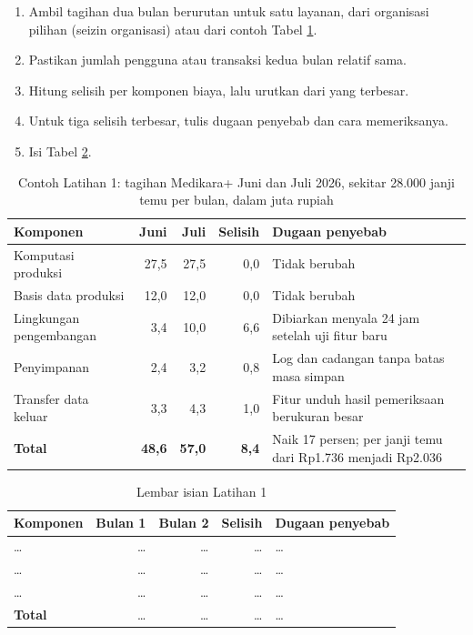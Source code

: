 \begin{enumerate}
  \item Ambil tagihan dua bulan berurutan untuk satu layanan, dari organisasi pilihan (seizin
        organisasi) atau dari contoh Tabel \ref{tab:ch03-lat1-contoh}.
  \item Pastikan jumlah pengguna atau transaksi kedua bulan relatif sama.
  \item Hitung selisih per komponen biaya, lalu urutkan dari yang terbesar.
  \item Untuk tiga selisih terbesar, tulis dugaan penyebab dan cara memeriksanya.
  \item Isi Tabel \ref{tab:ch03-lat1-hasil}.
\end{enumerate}

\begin{table}[!htb]
  \centering
  \caption{Contoh Latihan 1: tagihan Medikara+ Juni dan Juli 2026, sekitar
           28.000 janji temu per bulan, dalam juta rupiah}
  \label{tab:ch03-lat1-contoh}
  \footnotesize
  \begin{tabularx}{\textwidth}{>{\raggedright\arraybackslash}p{2.8cm} r r r >{\raggedright\arraybackslash}X}
    \hline
    \textbf{Komponen} & \textbf{Juni} & \textbf{Juli} & \textbf{Selisih} & \textbf{Dugaan penyebab}
      \\ \hline
    Komputasi produksi & 27,5 & 27,5 & 0,0 & Tidak berubah \\ \hline
    Basis data produksi & 12,0 & 12,0 & 0,0 & Tidak berubah \\ \hline
    Lingkungan pengembangan & 3,4 & 10,0 & 6,6 & Dibiarkan menyala 24 jam setelah uji fitur baru \\
      \hline
    Penyimpanan & 2,4 & 3,2 & 0,8 & Log dan cadangan tanpa batas masa simpan \\ \hline
    Transfer data keluar & 3,3 & 4,3 & 1,0 & Fitur unduh hasil pemeriksaan berukuran besar \\ \hline
    \textbf{Total} & \textbf{48,6} & \textbf{57,0} & \textbf{8,4} & Naik 17 persen; per janji temu
      dari Rp1.736 menjadi Rp2.036 \\ \hline
  \end{tabularx}
\end{table}

\begin{table}[!htb]
  \centering
  \caption{Lembar isian Latihan 1}
  \label{tab:ch03-lat1-hasil}
  \footnotesize
  \begin{tabularx}{\textwidth}{>{\raggedright\arraybackslash}p{2.8cm} r r r >{\raggedright\arraybackslash}X}
    \hline
    \textbf{Komponen} & \textbf{Bulan 1} & \textbf{Bulan 2} & \textbf{Selisih} & \textbf{Dugaan
      penyebab} \\ \hline
    \dots & \dots & \dots & \dots & \dots \\ \hline
    \dots & \dots & \dots & \dots & \dots \\ \hline
    \dots & \dots & \dots & \dots & \dots \\ \hline
    \textbf{Total} & \dots & \dots & \dots & \dots \\ \hline
  \end{tabularx}
\end{table}


